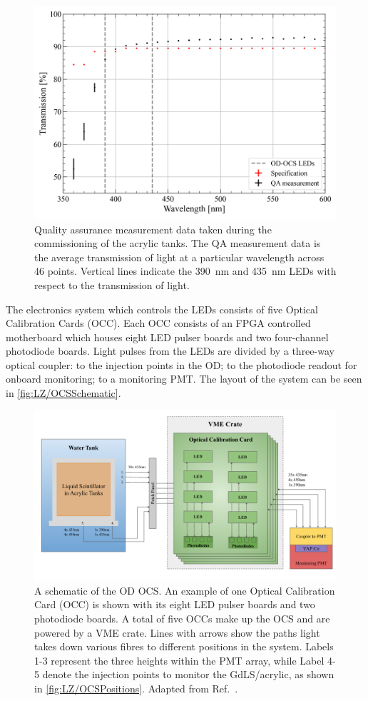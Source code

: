\begin{figure}[!ht]
    \centering
    \includegraphics[width=0.7\linewidth]{figures/LZ/T187-XDM-UVT_WAVELENGHT_08252017.png}
    \caption[Quality assurance measurement data taken during the commissioning of the acrylic tanks.]{Quality assurance measurement data taken during the commissioning of the acrylic tanks. The QA measurement data is the average transmission of light at a particular wavelength across 46 points. Vertical lines indicate the 390~nm and 435~nm LEDs with respect to the transmission of light.}
    \label{fig:LZ/AcrylicQA}
\end{figure}
The electronics system which controls the LEDs consists of five Optical Calibration Cards (OCC). Each OCC consists of an FPGA controlled motherboard which houses eight LED pulser boards and two four-channel photodiode boards. Light pulses from the LEDs are divided by a three-way optical coupler: to the injection points in the OD; to the photodiode readout for onboard monitoring; to a monitoring PMT. The layout of the system can be seen in \autoref{fig:LZ/OCSSchematic}.
\begin{figure}[!ht]
    \centering
    \includegraphics[width=0.9\linewidth]{figures/LZ/OCSSchematics.pdf}
    \caption[A schematic of the OD OCS. An example of one Optical Calibration Card is shown with its eight LED pulser boards and two photodiode boards.]{A schematic of the OD OCS. An example of one Optical Calibration Card (OCC) is shown with its eight LED pulser boards and two photodiode boards. A total of five OCCs make up the OCS and are powered by a VME crate. Lines with arrows show the paths light takes down various fibres to different positions in the system. Labels 1-3 represent the three heights within the PMT array, while Label 4-5 denote the injection points to monitor the GdLS/acrylic, as shown in \autoref{fig:LZ/OCSPositions}. Adapted from Ref.~\cite{Turner:2021qvi,LZ:2024bsz}.}
    \label{fig:LZ/OCSSchematic}
\end{figure}
